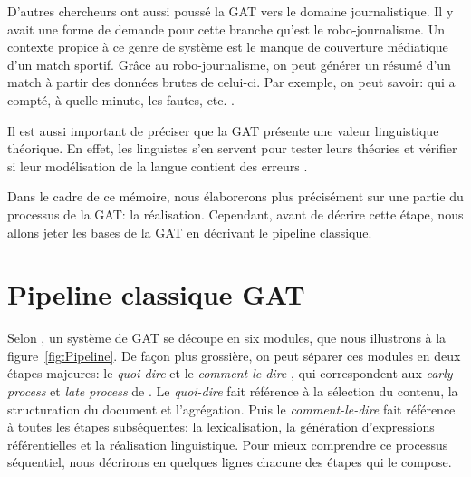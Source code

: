 D'autres chercheurs ont aussi poussé la \ac{GAT} vers le domaine journalistique. Il y avait une forme de demande pour cette branche qu'est le robo-journalisme. Un contexte propice à ce genre de système est le manque de couverture médiatique d'un match sportif. Grâce au robo-journalisme, on peut générer un résumé d'un match à partir des données brutes de celui-ci. Par exemple, on peut savoir: qui a compté, à quelle minute, les fautes, etc. \citep{W17-3513}.

Il est aussi important de préciser que la \ac{GAT} présente une valeur linguistique théorique. En effet, les linguistes s'en servent pour tester leurs théories et vérifier si leur modélisation de la langue contient des erreurs \citep{DanlosPresentationmodelegeneration1983}. 

Dans le cadre de ce mémoire, nous élaborerons plus précisément sur une partie du processus de la \ac{GAT}: la réalisation. Cependant, avant de décrire cette étape, nous allons jeter les bases de la \ac{GAT} en décrivant le pipeline classique.


\section{Pipeline classique GAT} \label{ppc}

Selon \cite{ReiterBuildingNaturalLanguage2000}, un système de \ac{GAT} se découpe en six modules, que nous illustrons à la figure~\ref{fig:Pipeline}. De façon plus grossière, on peut séparer ces modules en deux étapes majeures: le \emph{quoi-dire} et le \emph{comment-le-dire} \citep{DanlosPresentationmodelegeneration1983}, qui correspondent aux \emph{early process} et \emph{late process} de \cite{gatt18}. Le \emph{quoi-dire} fait référence à la sélection du contenu, la structuration du document et l'agrégation. Puis le \emph{comment-le-dire} fait référence à toutes les étapes subséquentes: la lexicalisation, la génération d'expressions référentielles et la réalisation linguistique. Pour mieux comprendre ce processus séquentiel, nous décrirons en quelques lignes chacune des étapes qui le compose.

